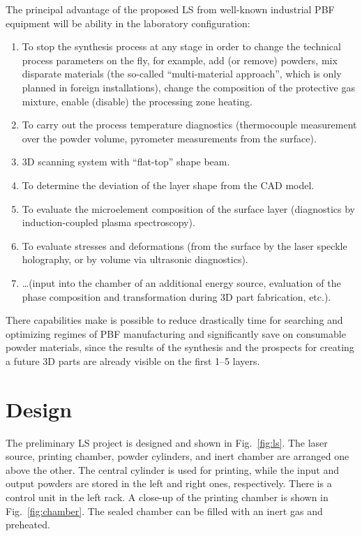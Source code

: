 \documentclass{article}
\begin{document}
The principal advantage of the proposed LS from well-known industrial PBF equipment will be ability in the laboratory configuration:
\begin{enumerate}
    \item To stop the synthesis process at any stage in order to change the technical process parameters on the fly, for example,
    add (or remove) powders, mix disparate materials (the so-called ``multi-material approach'', which is only planned in foreign installations),
    change the composition of the protective gas mixture, enable (disable) the processing zone heating.
    \item To carry out the process temperature diagnostics (thermocouple measurement over the powder volume, pyrometer measurements from the surface).
    \item 3D scanning system with ``flat-top'' shape beam.
    \item To determine the deviation of the layer shape from the CAD model.
    \item To evaluate the microelement composition of the surface layer (diagnostics by induction-coupled plasma spectroscopy).
    \item To evaluate stresses and deformations (from the surface by the laser speckle holography, or by volume via ultrasonic diagnostics).
    \item \dots (input into the chamber of an additional energy source, evaluation of the phase composition
    and transformation during 3D part fabrication, etc.).
\end{enumerate}

There capabilities make is possible to reduce drastically time for searching and optimizing regimes of PBF manufacturing
and significantly save on consumable powder materials, since the results of the synthesis and the prospects for creating
a future 3D parts are already visible on the first 1--5 layers.

\section{Design}

The preliminary LS project is designed and shown in Fig.~\ref{fig:ls}.
The laser source, printing chamber, powder cylinders, and inert chamber are arranged one above the other.
The central cylinder is used for printing, while the input and output powders are stored in the left and right ones, respectively.
There is a control unit in the left rack.
A close-up of the printing chamber is shown in Fig.~\ref{fig:chamber}.
The sealed chamber can be filled with an inert gas and preheated.
\end{document}
